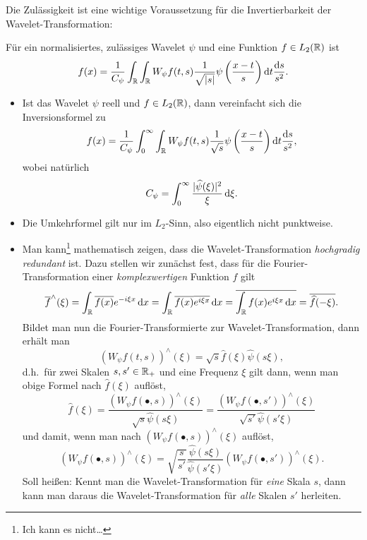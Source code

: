 Die Zulässigkeit ist eine wichtige Voraussetzung für die Invertierbarkeit der 
Wavelet-Transformation:

\begin{proposition}
Für ein normalisiertes, zulässiges Wavelet $ \psi $ und eine Funktion $ f \in L_{2}(\mathbb{R}) $ ist
\[
  f(x) = \frac{1}{C_{\psi}} \int_{\R} \int_{\R} W_{\psi} f(t,s)
            \frac{1}{\sqrt{|s|}} \psi\left( \frac{x - t}{s} \right) \dif t \frac{\dif s}{s^{2}}.
\]
\end{proposition}

\begin{remark} \leavevmode
\begin{itemize}
\item Ist das Wavelet $ \psi $ reell und $ f \in L_{2}(\mathbb{R}) $, dann vereinfacht sich die 
Inversionsformel zu
\[
  f(x) = \frac{1}{C_{\psi}} \int_{0}^{\infty} \int_{\R} W_{\psi} f(t,s)
            \frac{1}{\sqrt{s}} \psi\left( \frac{x - t}{s} \right) \dif t \frac{\dif s}{s^{2}},
\]
wobei natürlich
\[
  C_{\psi} = \int_{0}^{\infty} \frac{|\widehat{\psi}(\xi)|^{2}}{\xi} \dif \xi.
\]
\item Die Umkehrformel gilt nur im $ L_{2} $-Sinn, also eigentlich nicht punktweise.
\item Man kann\footnote{Ich kann es nicht\dots} mathematisch zeigen, dass die 
  Wavelet-Transformation \emph{hochgradig redundant} ist. Dazu stellen wir zunächst fest, dass für 
  die Fourier-Transformation einer \emph{komplexwertigen} Funktion $ f $ gilt
  \[
      \overline{f}^{\wedge}(\xi) 
    = \int_{\R} \overline{f(x)} e^{-i\xi x} \dif x
    = \int_{\R} \overline{f(x)} \overline{e^{i\xi x}} \dif x
    = \overline{\int_{\R} f(x) e^{i\xi x} \dif x}
    = \overline{\widehat{f}(-\xi)}.
  \]
  Bildet man nun die Fourier-Transformierte zur Wavelet-Transformation, dann erhält man
  \[
    (W_{\psi}f(t,s))^{\wedge}(\xi) = \sqrt{s} \widehat{f}(\xi) \widehat{\psi}(s\xi),
  \]
  d.h.\ für zwei Skalen $ s, s' \in \mathbb{R}_{+} $ und eine Frequenz $ \xi $ gilt dann, wenn man obige
  Formel nach $ \widehat{f}(\xi) $ auflöst,
  \[
     \widehat{f}(\xi)
   = \frac{(W_{\psi}f(\bullet,s))^{\wedge}(\xi)}{\sqrt{s}\widehat{\psi}(s\xi)}
   = \frac{(W_{\psi}f(\bullet,s'))^{\wedge}(\xi)}{\sqrt{s'}\widehat{\psi}(s'\xi)}
  \]
  und damit, wenn man nach $ (W_{\psi}f(\bullet,s))^{\wedge}(\xi) $ auflöst,
  \[
      (W_{\psi}f(\bullet,s))^{\wedge}(\xi)
    = \sqrt{\frac{s}{s'}} \frac{\widehat{\psi}(s\xi)}{\widehat{\psi}(s'\xi)}
      (W_{\psi}f(\bullet,s'))^{\wedge}(\xi).
  \]
  Soll heißen: Kennt man die Wavelet-Transformation für \emph{eine} Skala $ s $, dann kann man
  daraus die Wavelet-Transformation für \emph{alle} Skalen $ s' $ herleiten.
\end{itemize}
\end{remark}

